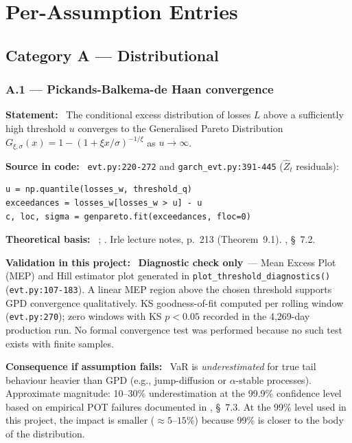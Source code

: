 \documentclass[11pt,a4paper]{article}
\newcommand{\asmfield}[1]{\medskip\noindent\textbf{#1:}\ }
\newcommand{\code}[1]{\texttt{#1}}
\newcommand{\diagnostic}{\textbf{Diagnostic check only}}
\begin{document}
\section{Per-Assumption Entries}\label{sec:entries}

\subsection{Category A --- Distributional}\label{sec:catA}

\subsubsection{A.1 --- Pickands-Balkema-de Haan convergence}\label{asm:A1}

\asmfield{Statement}
The conditional excess distribution of losses $L$ above a sufficiently
high threshold $u$ converges to the Generalised Pareto Distribution
$G_{\xi,\sigma}(x) = 1 - (1 + \xi x/\sigma)^{-1/\xi}$ as $u \to \infty$.

\asmfield{Source in code}
\code{evt.py:220-272} and \code{garch\_evt.py:391-445} ($\hat{Z}_t$ residuals):
\begin{lstlisting}
u = np.quantile(losses_w, threshold_q)
exceedances = losses_w[losses_w > u] - u
c, loc, sigma = genpareto.fit(exceedances, floc=0)
\end{lstlisting}

\asmfield{Theoretical basis}
\cite{Pickands1975}; \cite{BalkemadeHaan1974}. Irle lecture notes,
p.~213 (Theorem~9.1). \cite{McNeilFreyEmbrechts2005}, \S~7.2.

\asmfield{Validation in this project}
\diagnostic\ --- Mean Excess Plot (MEP) and Hill estimator plot generated
in \code{plot\_threshold\_diagnostics()} (\code{evt.py:107-183}). A linear
MEP region above the chosen threshold supports GPD convergence
qualitatively. KS goodness-of-fit computed per rolling window
(\code{evt.py:270}); zero windows with KS $p < 0.05$ recorded in the
4{,}269-day production run. No formal convergence test was performed
because no such test exists with finite samples.

\asmfield{Consequence if assumption fails}
VaR is \emph{underestimated} for true tail behaviour heavier than GPD
(e.g., jump-diffusion or $\alpha$-stable processes). Approximate
magnitude: 10--30\% underestimation at the 99.9\% confidence level based
on empirical POT failures documented in \cite{McNeilFreyEmbrechts2005},
\S~7.3. At the 99\% level used in this project, the impact is smaller
($\approx 5$--$15\%$) because 99\% is closer to the body of the
distribution.
\end{document}
